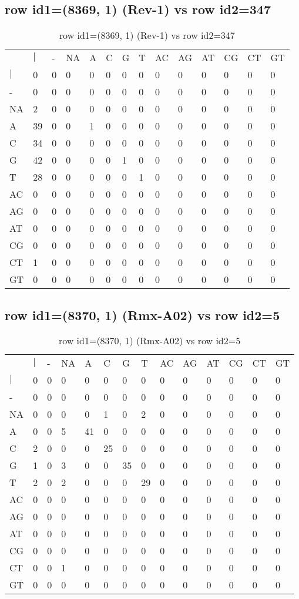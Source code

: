 \subsection{row id1=(8369, 1) (Rev-1) vs row id2=347}
\begin{center}
\begin{longtable}{|l|l|l|l|l|l|l|l|l|l|l|l|l|l|}
\caption{row id1=(8369, 1) (Rev-1) vs row id2=347} \label{table_dm400}\\
\hline
\\
\hline
&$|$&-&NA&A&C&G&T&AC&AG&AT&CG&CT&GT\\
$|$&0&0&0&0&0&0&0&0&0&0&0&0&0\\
-&0&0&0&0&0&0&0&0&0&0&0&0&0\\
NA&2&0&0&0&0&0&0&0&0&0&0&0&0\\
A&39&0&0&1&0&0&0&0&0&0&0&0&0\\
C&34&0&0&0&0&0&0&0&0&0&0&0&0\\
G&42&0&0&0&0&1&0&0&0&0&0&0&0\\
T&28&0&0&0&0&0&1&0&0&0&0&0&0\\
AC&0&0&0&0&0&0&0&0&0&0&0&0&0\\
AG&0&0&0&0&0&0&0&0&0&0&0&0&0\\
AT&0&0&0&0&0&0&0&0&0&0&0&0&0\\
CG&0&0&0&0&0&0&0&0&0&0&0&0&0\\
CT&1&0&0&0&0&0&0&0&0&0&0&0&0\\
GT&0&0&0&0&0&0&0&0&0&0&0&0&0\\
\hline
\end{longtable}
\end{center}

\subsection{row id1=(8370, 1) (Rmx-A02) vs row id2=5}
\begin{center}
\begin{longtable}{|l|l|l|l|l|l|l|l|l|l|l|l|l|l|}
\caption{row id1=(8370, 1) (Rmx-A02) vs row id2=5} \label{table_dm402}\\
\hline
\\
\hline
&$|$&-&NA&A&C&G&T&AC&AG&AT&CG&CT&GT\\
$|$&0&0&0&0&0&0&0&0&0&0&0&0&0\\
-&0&0&0&0&0&0&0&0&0&0&0&0&0\\
NA&0&0&0&0&1&0&2&0&0&0&0&0&0\\
A&0&0&5&41&0&0&0&0&0&0&0&0&0\\
C&2&0&0&0&25&0&0&0&0&0&0&0&0\\
G&1&0&3&0&0&35&0&0&0&0&0&0&0\\
T&2&0&2&0&0&0&29&0&0&0&0&0&0\\
AC&0&0&0&0&0&0&0&0&0&0&0&0&0\\
AG&0&0&0&0&0&0&0&0&0&0&0&0&0\\
AT&0&0&0&0&0&0&0&0&0&0&0&0&0\\
CG&0&0&0&0&0&0&0&0&0&0&0&0&0\\
CT&0&0&1&0&0&0&0&0&0&0&0&0&0\\
GT&0&0&0&0&0&0&0&0&0&0&0&0&0\\
\hline
\end{longtable}
\end{center}


